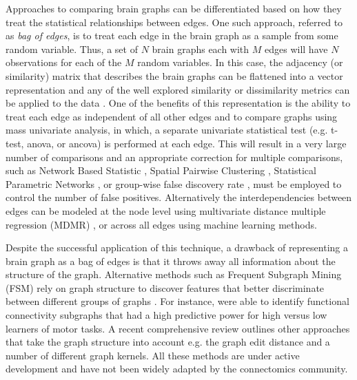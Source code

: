 Approaches to comparing brain graphs can be differentiated based on how they treat the statistical relationships between edges. One such approach, referred to as \emph{bag of edges}, is to treat each edge in the brain graph as a sample from some random variable. Thus, a set of $N$ brain graphs each with $M$ edges will have $N$ observations for each of the $M$ random variables. In this case, the adjacency (or similarity) matrix that describes the brain graphs can be flattened into a vector representation and any of the well explored similarity or dissimilarity metrics can be applied to the data \cite{Craddock2013}. One of the benefits of this representation is the ability to treat each edge as independent of all other edges and to compare graphs using mass univariate analysis, in which, a separate univariate statistical test (e.g. t-test, anova, or ancova) is performed at each edge. This will result in a very large number of comparisons and an appropriate correction for multiple comparisons, such as Network Based Statistic \cite{Zalesky2012}, Spatial Pairwise Clustering \cite{Zalesky2012}, Statistical Parametric Networks \cite{Ginestat2011}, or group-wise false discovery rate \cite{Benjamini2001}, must be employed to control the number of false positives. Alternatively the interdependencies between edges can be modeled at the node level using multivariate distance multiple regression (MDMR) \cite{Shehzad2014}, or across all edges using machine learning methods\cite{Craddock2009, Dosenbach2010, Richiardi2011}.

Despite the successful application of this technique, a drawback of representing a brain graph as a bag of edges is that it throws away all information about the structure of the graph. Alternative methods such as Frequent Subgraph Mining (FSM) rely on graph structure to discover features that better discriminate between different groups of graphs \cite{Thoma2010}. For instance, \cite{Bogdanov2014} were able to identify functional connectivity subgraphs that had a high predictive power for high versus low learners of motor tasks. A recent comprehensive review \cite{Richiardi2013} outlines other approaches that take the graph structure into account e.g. the graph edit distance and a number of different graph kernels. All these methods are under active development and have not been widely adapted by the connectomics community.

